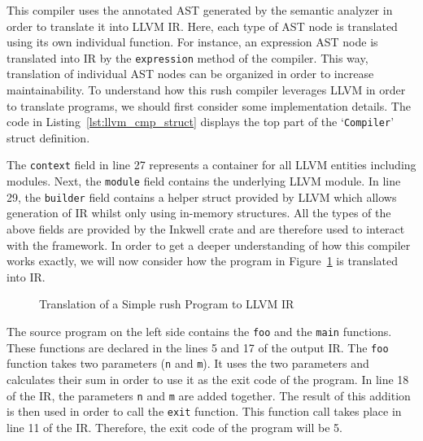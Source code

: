 This compiler uses the annotated AST generated by the semantic analyzer in order to translate it into LLVM IR.
Here, each type of AST node is translated using its own individual function.
For instance, an expression AST node is translated into IR by the \texttt{expression} method of the compiler.
This way, translation of individual AST nodes can be organized in order to increase maintainability.
To understand how this rush compiler leverages LLVM in order to translate programs, we should first consider some implementation details.
The code in Listing~\ref{lst:llvm_cmp_struct} displays the top part of the `\texttt{Compiler}' struct definition.


The \texttt{context} field in line 27 represents a container for all LLVM entities including modules.
Next, the \texttt{module} field contains the underlying LLVM module.
In line 29, the \texttt{builder} field contains a helper struct provided by LLVM which allows generation of IR whilst only using in-memory structures.
All the types of the above fields are provided by the Inkwell crate and are therefore used to interact with the framework.
In order to get a deeper understanding of how this compiler works exactly, we will now consider how the program in Figure~\ref{fig:llvm_simple} is translated into IR.

\noindent
\begin{figure}[h]
	\begin{minipage}{.5\textwidth}
		\centering
	\end{minipage}%
	\begin{minipage}{.5\textwidth}
		\centering
	\end{minipage}
	\caption{Translation of a Simple rush Program to LLVM IR}\label{fig:llvm_simple}
\end{figure}

The source program on the left side contains the \texttt{foo} and the \texttt{main} functions.
These functions are declared in the lines 5 and 17 of the output IR.
The \texttt{foo} function takes two parameters (\texttt{n} and \texttt{m}).
It uses the two parameters and calculates their sum in order to use it as the exit code of the program.
In line 18 of the IR, the parameters \texttt{n} and \texttt{m} are added together.
The result of this addition is then used in order to call the \texttt{exit} function.
This function call takes place in line 11 of the IR.
Therefore, the exit code of the program will be 5.

